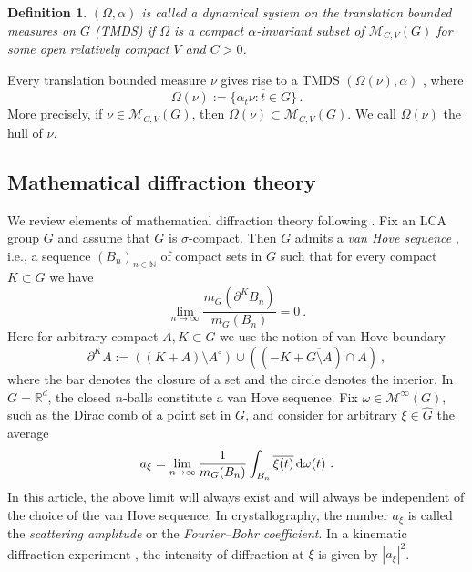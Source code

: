 \documentclass[11pt, a4wide]{amsart}
\newcommand{\MCV}{\mathcal{M}_{C,V}(G)}
\newcommand{\Oomega}{(\varOmega,\alpha)}
\newtheorem{definition}[lemma]{Definition}
\numberwithin{lemma}{section}
\begin{document}
\begin{definition}
  $\Oomega$ is called a dynamical system on the translation bounded
  measures on\/ $G$  {\rm (TMDS)} if
  $\varOmega$ is a compact  $\alpha$-invariant subset of\/ $\MCV$ for some open relatively compact $V$ and $C>0$.
 \end{definition}

Every translation bounded measure $\nu$ gives rise to a TMDS
$(\Omega(\nu),\alpha)$ \cite{BL}, where
%
\begin{displaymath}
\Omega(\nu):=\overline{\{\alpha_t\nu : t\in G\}}\,.
\end{displaymath}
%
More precisely, if $\nu\in \MCV$, then $\varOmega(\nu) \subset \MCV$. We call $\Omega(\nu)$ the hull of $\nu$.


\subsection{Mathematical diffraction theory}\label{difftheo}

We review elements of mathematical diffraction theory following \cite{BL,BL2,Len}.
Fix an LCA group $G$ and assume that $G$ is $\sigma$-compact. Then $G$ admits a \textit{van Hove sequence} \cite{Martin2}, i.e., a sequence $(B_n)_{n\in\mathbb N}$ of compact sets in $G$ such that for every  compact $K\subset G$ we have
%
$$
\lim_{n\to \infty} \frac{m_G (\partial^K B_n)}{m_G (B_n)} =0 \ .
$$
%
Here for arbitrary compact $A,K\subset G$ we use the notion of van Hove boundary
%
\begin{displaymath}
\partial^K A:= (( K + A )\setminus A^\circ ) \cup (( - K +\overline{G\setminus A})\cap A ) \ ,
\end{displaymath}
%
where the bar denotes the closure of a set and the circle denotes the
interior. In $G=\mathbb R^d$, the closed $n$-balls constitute a van Hove sequence. Fix $\omega\in \mathcal M^\infty(G)$, such as the Dirac comb of a point set in $G$, and consider for arbitrary  $\xi\in \widehat G$ the average
%
\begin{equation}
a_\xi = \lim_{n\to \infty} \frac{1}{m_G(B_n)} \int_{B_n} \overline{\xi (t)} \, {\rm d}\omega(t) \ .
\end{equation}
%
 In this article, the above limit will always exist and will always be independent of the choice of the van Hove sequence. In crystallography, the number $a_\xi$ is called the \textit{scattering amplitude} or the \textit{Fourier--Bohr coefficient}. In a kinematic diffraction experiment \cite{Cowley}, the  intensity of diffraction at $\xi$ is given by $|a_\xi|^2$.
\end{document}
